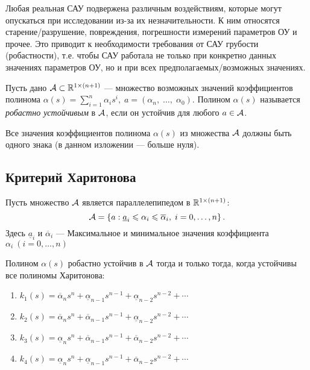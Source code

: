 \documentclass[../../TAU.tex]{subfiles}
\begin{document}
    Любая реальная САУ подвержена различным воздействиям, которые могут опускаться при исследовании из-за их незначительности. К ним относятся старение/разрушение, повреждения, погрешности измерений параметров ОУ и прочее. Это приводит к необходимости требования от САУ грубости (робастности), т.е. чтобы САУ работала не только при конкретно данных значениях параметров ОУ, но и при всех предполагаемых/возможных значениях.

     Пусть дано 
    $\mathcal{A}\subset\mathbb{R}^{1\times(n+1)}$ --- 
    множество возможных значений коэффициентов полинома 
    $\alpha(s) = \sum_{i=1}^{n}\alpha_is^i, \; a = (\alpha_n,\; \ldots,\; \alpha_0)$. 
    Полином $\alpha(s)$ называется {\it робастно устойчивым} в $\mathcal{A}$, если он устойчив для любого $a\in \mathcal{A}$.

    \begin{theor}
        Все значения коэффициентов полинома $\alpha(s)$ из множества $\mathcal{A}$ должны быть одного знака (в данном изложении --- больше нуля).
    \end{theor}

\subsection{Критерий Харитонова}

    Пусть множество $\mathcal{A}$ является параллелепипедом в $\mathbb{R}^{1\times (n+1)}$:
    $$
        \mathcal{A}=\left\{a: \underline{ a}_i\leqslant \alpha_i \leqslant \overline \alpha_i, \; i=0,\ldots,n\right\}.
    $$
    Здесь $\underline{a}_i$ и $\overline \alpha_i$ ---
    Максимальное и минимальное значения коэффициента $\alpha_i\ (i=0,\dots,n)$

    \begin{theor}
        Полином $\alpha(s)$ робастно устойчив в $\mathcal{A}$ тогда и только тогда, когда устойчивы все полиномы Харитонова:
        \begin{enumerate}
            \item 
                $k_1(s) = \overline{\alpha}_n s^n + \underline{\alpha}_{n-1} s^{n-1} + \underline{\alpha}_{n-2} s^{n-2} + \cdots$
            \item 
                $k_2(s) = \overline \alpha_n s^n + \overline \alpha_{n-1} s^{n-1} + \underline{\alpha}_{n-2} s^{n-2} + \cdots$
            \item 
                $k_3(s) = \underline{\alpha}_n s^n + \overline \alpha_{n-1} s^{n-1} + \overline \alpha_{n-2} s^{n-2} + \cdots$
            \item 
                $k_4(s) = \underline{\alpha}_n s^n + \underline{\alpha}_{n-1} s^{n-1} + \overline \alpha_{n-2} s^{n-2} + \cdots$
        \end{enumerate}

    \end{theor}
\end{document}
